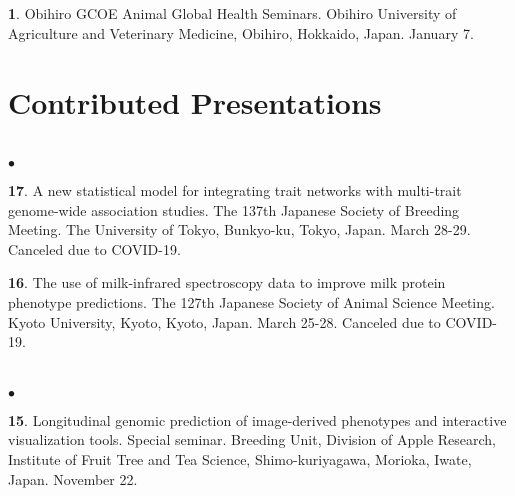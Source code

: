 \documentclass[margin,line,10pt]{res}
\newenvironment{list1}{
  \begin{list}{\ding{113}}{%
      \setlength{\itemsep}{0in}
      \setlength{\parsep}{0in} \setlength{\parskip}{0in}
      \setlength{\topsep}{0in} \setlength{\partopsep}{0in} 
      \setlength{\leftmargin}{0.17in}}}{\end{list}}
\newenvironment{list2}{
  \begin{list}{$\bullet$}{%
      \setlength{\itemsep}{0in}
      \setlength{\parsep}{0in} \setlength{\parskip}{0in}
      \setlength{\topsep}{0in} \setlength{\partopsep}{0in} 
      \setlength{\leftmargin}{0.2in}}}{\end{list}}
\begin{document}
\begin{resume}
\section{}
\begin{list1}
\item [{\bf 1}.] Obihiro GCOE Animal Global Health Seminars.  Obihiro University of Agriculture and  Veterinary Medicine, Obihiro, Hokkaido, Japan. January 7. 
\end{list1}  



\vspace{0.5cm}
\section{\sc Contributed Presentations}
\vspace{1.0cm}

\section{}
\begin{list2}

  \item [{\bf 17}.] A new statistical model for integrating trait networks with multi-trait genome-wide association studies. The 137th Japanese Society of Breeding Meeting. The University of Tokyo, Bunkyo-ku, Tokyo, Japan. March 28-29. Canceled due to COVID-19.
 
  \vspace{0.5cm}
  
  \item [{\bf 16}.] The use of milk-infrared spectroscopy data to improve milk protein phenotype predictions. The 127th Japanese Society of Animal Science Meeting. Kyoto University, Kyoto, Kyoto, Japan. March 25-28. Canceled due to COVID-19.
  
\end{list2}  



\section{}
\begin{list2}

\item [{\bf 15}.] Longitudinal genomic prediction of image-derived phenotypes and interactive visualization tools. Special seminar. Breeding Unit, Division of Apple Research, Institute of Fruit Tree and Tea Science, Shimo-kuriyagawa, Morioka, Iwate, Japan. November 22.
  

\end{list2}
\end{resume}
\end{document}
